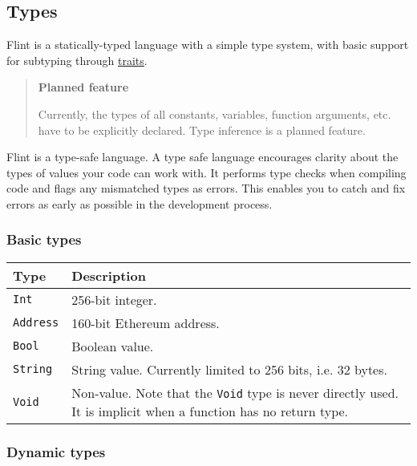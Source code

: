 \subsection{Types}
\label{sec:appendix-b-types}

Flint is a statically-typed language with a simple type system, with basic support for subtyping through \hyperref[sec:appendix-b-traits]{traits}.

\begin{quote}
\textbf{Planned feature}

Currently, the types of all constants, variables, function arguments, etc. have to be explicitly declared. Type inference is a planned feature.
\end{quote}

Flint is a type-safe language. A type safe language encourages clarity about the types of values your code can work with. It performs type checks when compiling code and flags any mismatched types as errors. This enables you to catch and fix errors as early as possible in the development process.

\subsubsection{Basic types}
\label{sec:appendix-b-basic-types}

\begin{tabularx}{\textwidth}{lX}
	Type & Description\\\hline
	\texttt{Int} & 256-bit integer.\\
	\texttt{Address} & 160-bit Ethereum address.\\
	\texttt{Bool} & Boolean value.\\
	\texttt{String} & String value. Currently limited to 256 bits, i.e. 32 bytes.\\
	\texttt{Void} & Non-value. Note that the \texttt{Void} type is never directly used. It is implicit when a function has no return type.
\end{tabularx}

\subsubsection{Dynamic types}
\label{sec:appendix-b-dynamic-types}

